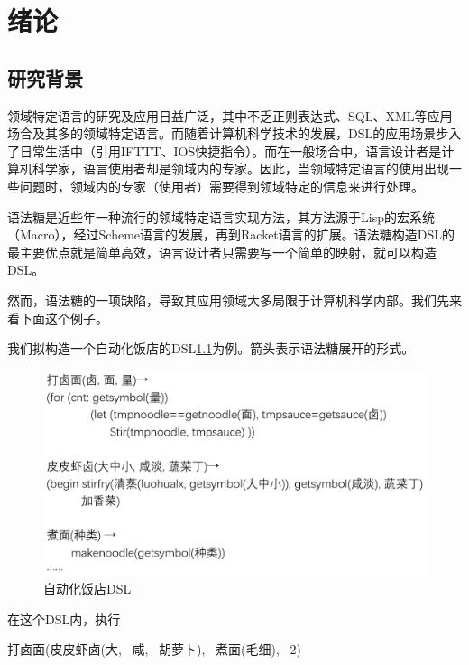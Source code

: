 \pagestyle{fancy}
\normalsize
\linespread{1.5}\selectfont
\chapter{绪论}

\section{研究背景}
领域特定语言的研究及应用日益广泛，其中不乏正则表达式、SQL、XML等应用场合及其多的领域特定语言。而随着计算机科学技术的发展，DSL的应用场景步入了日常生活中（引用IFTTT、IOS快捷指令）。而在一般场合中，语言设计者是计算机科学家，语言使用者却是领域内的专家。因此，当领域特定语言的使用出现一些问题时，领域内的专家（使用者）需要得到领域特定的信息来进行处理。

语法糖是近些年一种流行的领域特定语言实现方法，其方法源于Lisp的宏系统（Macro），经过Scheme语言的发展，再到Racket语言的扩展。语法糖构造DSL的最主要优点就是简单高效，语言设计者只需要写一个简单的映射，就可以构造DSL。

然而，语法糖的一项缺陷，导致其应用领域大多局限于计算机科学内部。我们先来看下面这个例子。

	我们拟构造一个自动化饭店的DSL\ref{fig:restaurant}为例。箭头表示语法糖展开的形式。
	
	\begin{figure}[h]
		\centering
		\includegraphics[width=12cm]{images/chapter1/restaurant.png}
		\caption{自动化饭店DSL}
		\label{fig:restaurant}
	\end{figure}

在这个DSL内，执行

\begin{flushleft}
	打卤面(皮皮虾卤(大,~ 咸,~ 胡萝卜),~ 煮面(毛细),~ 2)
\end{flushleft}

